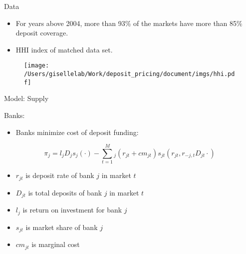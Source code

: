 \documentclass[notes,11pt, aspectratio=169]{beamer}
\begin{document}
\begin{frame}{Data}

  \begin{itemize}
    \item For years above 2004, more than 93\% of the markets have more than 85\% deposit coverage. 
    \item HHI index of matched data set. 
  \end{itemize}
  
    \begin{figure}[t*]
      \centering
    
      \texttt{[image: /Users/gisellelab/Work/deposit\_pricing/document/imgs/hhi.pdf]}
    \end{figure}
    
  \end{frame}






\begin{frame}{Model: Supply}
  
Banks:

\begin{itemize}
  \item Banks minimize cost of deposit funding:

\end{itemize}

\begin{equation}
  \label{eq:empirical-prev3}
  \pi_{j} =  l_j D_j s_j(\cdot) - \sum_{t=1}^M_j (r_{jt} + cm_{jt})s_{jt}(r_{jt}, r_{-j,t}D_{jt}\cdot) 
\end{equation}


\begin{itemize}
  \item $r_{jt}$ is deposit rate of bank $j$ in market $t$
  \item $D_{jt}$ is total deposits of bank $j$ in market $t$
  \item $l_j$ is return on investment for bank $j$
  \item $s_{jt}$ is market share of bank $j$
  \item $cm_{jt}$ is marginal cost

\end{itemize}

\end{frame}
\end{document}
